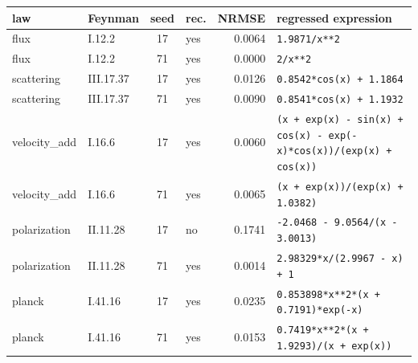 \begin{tabular}{llclrl}
\hline
law & Feynman & seed & rec. & NRMSE & regressed expression \\
\hline
flux & I.12.2 & 17 & yes & 0.0064 & \texttt{1.9871/x**2} \\
flux & I.12.2 & 71 & yes & 0.0000 & \texttt{2/x**2} \\
scattering & III.17.37 & 17 & yes & 0.0126 & \texttt{0.8542*cos(x) + 1.1864} \\
scattering & III.17.37 & 71 & yes & 0.0090 & \texttt{0.8541*cos(x) + 1.1932} \\
velocity\_add & I.16.6 & 17 & yes & 0.0060 & \texttt{(x + exp(x) - sin(x) + cos(x) - exp(-x)*cos(x))/(exp(x) + cos(x))} \\
velocity\_add & I.16.6 & 71 & yes & 0.0065 & \texttt{(x + exp(x))/(exp(x) + 1.0382)} \\
polarization & II.11.28 & 17 & no & 0.1741 & \texttt{-2.0468 - 9.0564/(x - 3.0013)} \\
polarization & II.11.28 & 71 & yes & 0.0014 & \texttt{2.98329*x/(2.9967 - x) + 1} \\
planck & I.41.16 & 17 & yes & 0.0235 & \texttt{0.853898*x**2*(x + 0.7191)*exp(-x)} \\
planck & I.41.16 & 71 & yes & 0.0153 & \texttt{0.7419*x**2*(x + 1.9293)/(x + exp(x))} \\
\hline
\end{tabular}
